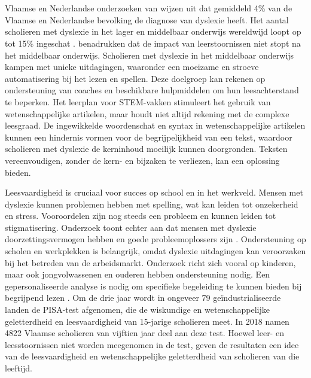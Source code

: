 \section{}%
\label{sec:probleemstelling}

Vlaamse en Nederlandse onderzoeken van \textcite{Wentink2008, Desoete2017} wijzen uit dat gemiddeld 4\% van de Vlaamse en Nederlandse bevolking de diagnose van dyslexie heeft. Het aantal scholieren met dyslexie in het lager en middelbaar onderwijs wereldwijd loopt op tot 15\% ingeschat \autocite{Bonte2020, VanDerMeer2022}. \textcite{Lissens2020} benadrukken dat de impact van leerstoornissen niet stopt na het middelbaar onderwijs. Scholieren met dyslexie in het middelbaar onderwijs kampen met unieke uitdagingen, waaronder een moeizame en stroeve automatisering bij het lezen en spellen. Deze doelgroep kan rekenen op ondersteuning van coaches en beschikbare hulpmiddelen om hun leesachterstand te beperken. Het leerplan voor STEM-vakken stimuleert het gebruik van wetenschappelijke artikelen, maar houdt niet altijd rekening met de complexe leesgraad. De ingewikkelde woordenschat en syntax in wetenschappelijke artikelen kunnen een hindernis vormen voor de begrijpelijkheid van een tekst, waardoor scholieren met dyslexie de kerninhoud moeilijk kunnen doorgronden. Teksten vereenvoudigen, zonder de kern- en bijzaken te verliezen, kan een oplossing bieden. 

Leesvaardigheid is cruciaal voor succes op school en in het werkveld. Mensen met dyslexie kunnen problemen hebben met spelling, wat kan leiden tot onzekerheid en stress. Vooroordelen zijn nog steeds een probleem en kunnen leiden tot stigmatisering. Onderzoek toont echter aan dat mensen met dyslexie doorzettingsvermogen hebben en goede probleemoplossers zijn \autocite{Ghesquiere2018, Lissens2020, Bonte2020}. Ondersteuning op scholen en werkplekken is belangrijk, omdat dyslexie uitdagingen kan veroorzaken bij het betreden van de arbeidsmarkt. Onderzoek richt zich vooral op kinderen, maar ook jongvolwassenen en ouderen hebben ondersteuning nodig. Een gepersonaliseerde analyse is nodig om specifieke begeleiding te kunnen bieden bij begrijpend lezen \autocite{VanVreckem2015, Lissens2020}. Om de drie jaar wordt in ongeveer 79 geïndustrialiseerde landen de PISA-test afgenomen, die de wiskundige en wetenschappelijke geletterdheid en leesvaardigheid van 15-jarige scholieren meet. In 2018 namen 4822 Vlaamse scholieren van vijftien jaar deel aan deze test. Hoewel leer- en leesstoornissen niet worden meegenomen in de test, geven de resultaten een idee van de leesvaardigheid en wetenschappelijke geletterdheid van scholieren van die leeftijd. 

